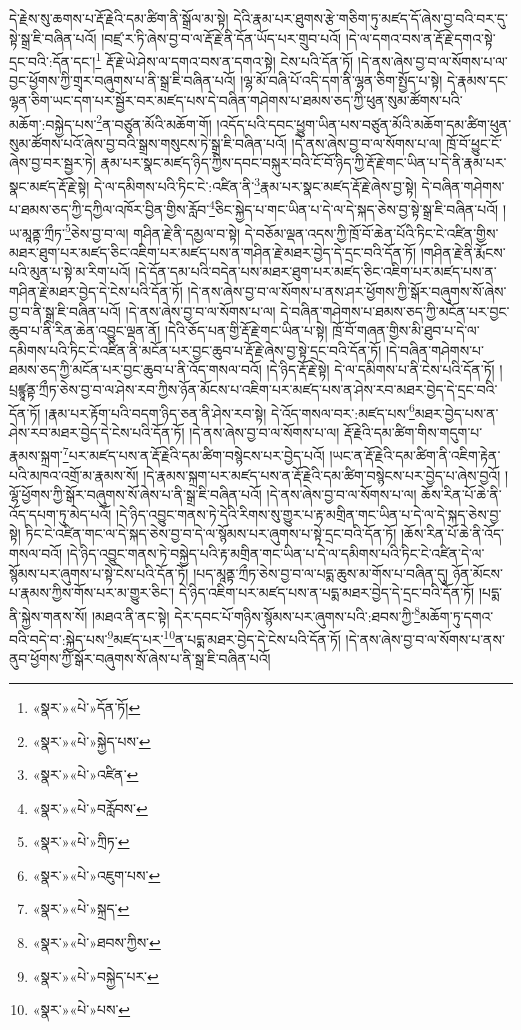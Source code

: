 དེ་རྗེས་སུ་ཆགས་པ་རྡོ་རྗེའི་དམ་ཚིག་ནི་སྒྲོལ་མ་སྟེ། དེའི་རྣམ་པར་ཐུགས་རྩེ་གཅིག་ཏུ་མཛད་དོ་ཞེས་བྱ་བའི་བར་དུ་སྟེ་སྒྲ་ཇི་བཞིན་པའོ། །བཛྲ་ར་ཏི་ཞེས་བྱ་བ་ལ་རྡོ་རྗེ་ནི་དོན་ཡོད་པར་གྲུབ་པའོ། །དེ་ལ་དགའ་བས་ན་རྡོ་རྗེ་དགའ་སྟེ་དྲང་བའི་:དོན་དང་།\footnote{«སྣར་»«པེ་»དོན་ཏོ།} རྡོ་རྗེ་ཡེ་ཤེས་ལ་དགའ་བས་ན་དགའ་སྟེ། ངེས་པའི་དོན་ཏོ། །དེ་ནས་ཞེས་བྱ་བ་ལ་སོགས་པ་ལ་བྱང་ཕྱོགས་ཀྱི་གྲྭར་བཞུགས་པ་ནི་སྒྲ་ཇི་བཞིན་པའོ། །ལྷ་མོ་བཞི་པོ་འདི་དག་ནི་ལྷན་ཅིག་སྤྱོད་པ་སྟེ། དེ་རྣམས་དང་ལྷན་ཅིག་ཡང་དག་པར་སྦྱོར་བར་མཛད་པས་དེ་བཞིན་གཤེགས་པ་ཐམས་ཅད་ཀྱི་ཕུན་སུམ་ཚོགས་པའི་མཆོག་:བསྐྱེད་པས་\footnote{«སྣར་»«པེ་»སྐྱེད་པས་}ན་བཙུན་མོའི་མཆོག་གོ། །འདོད་པའི་དབང་ཕྱུག་ཡིན་པས་བཙུན་མོའི་མཆོག་དམ་ཚིག་ཕུན་སུམ་ཚོགས་པའོ་ཞེས་བྱ་བའི་སྒྲས་གསུངས་ཏེ་སྒྲ་ཇི་བཞིན་པའོ། །དེ་ནས་ཞེས་བྱ་བ་ལ་སོགས་པ་ལ། ཁྲོ་བོ་ཕྱུང་ངོ་ཞེས་བྱ་བར་སྦྱར་ཏེ། རྣམ་པར་སྣང་མཛད་ཉིད་ཀྱིས་དབང་བསྐུར་བའི་ངོ་བོ་ཉིད་ཀྱི་རྡོ་རྗེ་གང་ཡིན་པ་དེ་ནི་རྣམ་པར་སྣང་མཛད་རྡོ་རྗེ་སྟེ། དེ་ལ་དམིགས་པའི་ཏིང་ངེ་:འཛིན་ནི་\footnote{«སྣར་»«པེ་»འཛིན་}རྣམ་པར་སྣང་མཛད་རྡོ་རྗེ་ཞེས་བྱ་སྟེ། དེ་བཞིན་གཤེགས་པ་ཐམས་ཅད་ཀྱི་དཀྱིལ་འཁོར་བྱིན་གྱིས་རློབ་\footnote{«སྣར་»«པེ་»བརློབས་}ཅིང་སྐྱེད་པ་གང་ཡིན་པ་དེ་ལ་དེ་སྐད་ཅེས་བྱ་སྟེ་སྒྲ་ཇི་བཞིན་པའོ། །ཡ་མཱནྟ་ཀྲྀཏ་\footnote{«སྣར་»«པེ་»ཀྲིཏ་}ཅེས་བྱ་བ་ལ། གཤིན་རྗེ་ནི་དམྱལ་བ་སྟེ། དེ་བཅོམ་ལྡན་འདས་ཀྱི་ཁྲོ་བོ་ཆེན་པོའི་ཏིང་ངེ་འཛིན་གྱིས་མཐར་ཐུག་པར་མཛད་ཅིང་འཇིག་པར་མཛད་པས་ན་གཤིན་རྗེ་མཐར་བྱེད་དེ་དྲང་བའི་དོན་ཏོ། །གཤིན་རྗེ་ནི་རྨོངས་པའི་མུན་པ་སྟེ་མ་རིག་པའོ། །དེ་དོན་དམ་པའི་བདེན་པས་མཐར་ཐུག་པར་མཛད་ཅིང་འཇིག་པར་མཛད་པས་ན་གཤིན་རྗེ་མཐར་བྱེད་དེ་ངེས་པའི་དོན་ཏོ། །དེ་ནས་ཞེས་བྱ་བ་ལ་སོགས་པ་ནས་ཤར་ཕྱོགས་ཀྱི་སྒོར་བཞུགས་སོ་ཞེས་བྱ་བ་ནི་སྒྲ་ཇི་བཞིན་པའོ། །དེ་ནས་ཞེས་བྱ་བ་ལ་སོགས་པ་ལ། དེ་བཞིན་གཤེགས་པ་ཐམས་ཅད་ཀྱི་མངོན་པར་བྱང་ཆུབ་པ་ནི་རིན་ཆེན་འབྱུང་ལྡན་ནོ། །དེའི་ཅོད་པན་གྱི་རྡོ་རྗེ་གང་ཡིན་པ་སྟེ། ཁྲོ་བོ་གཞན་གྱིས་མི་ཐུབ་པ་དེ་ལ་དམིགས་པའི་ཏིང་ངེ་འཛིན་ནི་མངོན་པར་བྱང་ཆུབ་པ་རྡོ་རྗེ་ཞེས་བྱ་སྟེ་དྲང་བའི་དོན་ཏོ། །དེ་བཞིན་གཤེགས་པ་ཐམས་ཅད་ཀྱི་མངོན་པར་བྱང་ཆུབ་པ་ནི་འོད་གསལ་བའོ། །དེ་ཉིད་རྡོ་རྗེ་སྟེ། དེ་ལ་དམིགས་པ་ནི་ངེས་པའི་དོན་ཏོ། །པྲཛྙཱནྟ་ཀྲྀཏ་ཅེས་བྱ་བ་ལ་ཤེས་རབ་ཀྱིས་ཉོན་མོངས་པ་འཇིག་པར་མཛད་པས་ན་ཤེས་རབ་མཐར་བྱེད་དེ་དྲང་བའི་དོན་ཏོ། །རྣམ་པར་རྟོག་པའི་བདག་ཉིད་ཅན་ནི་ཤེས་རབ་སྟེ། དེ་འོད་གསལ་བར་:མཛད་པས་\footnote{«སྣར་»«པེ་»འཇུག་པས་}མཐར་བྱེད་པས་ན་ཤེས་རབ་མཐར་བྱེད་དེ་ངེས་པའི་དོན་ཏོ། །དེ་ནས་ཞེས་བྱ་བ་ལ་སོགས་པ་ལ། རྡོ་རྗེའི་དམ་ཚིག་གིས་གདུག་པ་རྣམས་སྐྲག་\footnote{«སྣར་»«པེ་»སྐྲད་}པར་མཛད་པས་ན་རྡོ་རྗེའི་དམ་ཚིག་བསྙེངས་པར་བྱེད་པའོ། །ཡང་ན་རྡོ་རྗེའི་དམ་ཚིག་ནི་འཇིག་རྟེན་པའི་མཁའ་འགྲོ་མ་རྣམས་སོ། །དེ་རྣམས་སྐྲག་པར་མཛད་པས་ན་རྡོ་རྗེའི་དམ་ཚིག་བསྙེངས་པར་བྱེད་པ་ཞེས་བྱའོ། །ལྷོ་ཕྱོགས་ཀྱི་སྒོར་བཞུགས་སོ་ཞེས་པ་ནི་སྒྲ་ཇི་བཞིན་པའོ། །དེ་ནས་ཞེས་བྱ་བ་ལ་སོགས་པ་ལ། ཆོས་རིན་པོ་ཆེ་ནི་འོད་དཔག་ཏུ་མེད་པའོ། །དེ་ཉིད་འབྱུང་གནས་ཏེ་དེའི་རིགས་སུ་གྱུར་པ་རྟ་མགྲིན་གང་ཡིན་པ་དེ་ལ་དེ་སྐད་ཅེས་བྱ་སྟེ། ཏིང་ངེ་འཛིན་གང་ལ་དེ་སྐད་ཅེས་བྱ་བ་དེ་ལ་སྙོམས་པར་ཞུགས་པ་སྟེ་དྲང་བའི་དོན་ཏོ། །ཆོས་རིན་པོ་ཆེ་ནི་འོད་གསལ་བའོ། །དེ་ཉིད་འབྱུང་གནས་ཏེ་བསྐྱེད་པའི་རྟ་མགྲིན་གང་ཡིན་པ་དེ་ལ་དམིགས་པའི་ཏིང་ངེ་འཛིན་དེ་ལ་སྙོམས་པར་ཞུགས་པ་སྟེ་ངེས་པའི་དོན་ཏོ། །པད་མཱནྟ་ཀྲྀཏ་ཅེས་བྱ་བ་ལ་པདྨ་ཆུས་མ་གོས་པ་བཞིན་དུ། ཉོན་མོངས་པ་རྣམས་ཀྱིས་གོས་པར་མ་གྱུར་ཅིང་། དེ་ཉིད་འཇིག་པར་མཛད་པས་ན་པདྨ་མཐར་བྱེད་དེ་དྲང་བའི་དོན་ཏོ། །པདྨ་ནི་སྐྱེས་གནས་སོ། །མཐའ་ནི་ནང་སྟེ། དེར་དབང་པོ་གཉིས་སྙོམས་པར་ཞུགས་པའི་:ཐབས་ཀྱི་\footnote{«སྣར་»«པེ་»ཐབས་ཀྱིས་}མཆོག་ཏུ་དགའ་བའི་བདེ་བ་:སྐྱེད་པས་\footnote{«སྣར་»«པེ་»བསྐྱེད་པར་}མཛད་པར་\footnote{«སྣར་»«པེ་»པས་}ན་པདྨ་མཐར་བྱེད་དེ་ངེས་པའི་དོན་ཏོ། །དེ་ནས་ཞེས་བྱ་བ་ལ་སོགས་པ་ནས་ནུབ་ཕྱོགས་ཀྱི་སྒོར་བཞུགས་སོ་ཞེས་པ་ནི་སྒྲ་ཇི་བཞིན་པའོ། 